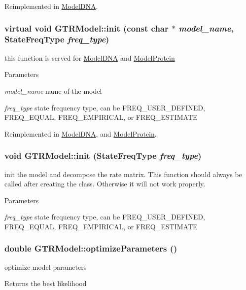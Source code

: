 Reimplemented in \hyperlink{classModelDNA_a4083dfee9b55936019483c5e9a4bb2f7}{ModelDNA}.\hypertarget{classGTRModel_ad0625a75ce5e8f5fca7f65657b2677b8}{
\subsubsection[{init}]{\setlength{\rightskip}{0pt plus 5cm}virtual void GTRModel::init (const char $\ast$ {\em model\_\-name}, \/  StateFreqType {\em freq\_\-type})}}
\label{classGTRModel_ad0625a75ce5e8f5fca7f65657b2677b8}
this function is served for \hyperlink{classModelDNA}{ModelDNA} and \hyperlink{classModelProtein}{ModelProtein} 
\begin{DoxyParams}{Parameters}
\item[{\em model\_\-name}]name of the model \item[{\em freq\_\-type}]state frequency type, can be FREQ\_\-USER\_\-DEFINED, FREQ\_\-EQUAL, FREQ\_\-EMPIRICAL, or FREQ\_\-ESTIMATE \end{DoxyParams}


Reimplemented in \hyperlink{classModelDNA_ad7f5b56ae6499a222c01ad81e92e27a2}{ModelDNA}, and \hyperlink{classModelProtein_a752778117ce79f5c0161397835fc6bf0}{ModelProtein}.\hypertarget{classGTRModel_a6a5736bfb839fca17dc6db2ee1cf91d5}{
\subsubsection[{init}]{\setlength{\rightskip}{0pt plus 5cm}void GTRModel::init (StateFreqType {\em freq\_\-type})}}
\label{classGTRModel_a6a5736bfb839fca17dc6db2ee1cf91d5}
init the model and decompose the rate matrix. This function should always be called after creating the class. Otherwise it will not work properly. 
\begin{DoxyParams}{Parameters}
\item[{\em freq\_\-type}]state frequency type, can be FREQ\_\-USER\_\-DEFINED, FREQ\_\-EQUAL, FREQ\_\-EMPIRICAL, or FREQ\_\-ESTIMATE \end{DoxyParams}
\hypertarget{classGTRModel_a01c47ec7ac4b856e60aa3e4339e0044a}{
\subsubsection[{optimizeParameters}]{\setlength{\rightskip}{0pt plus 5cm}double GTRModel::optimizeParameters ()}}
\label{classGTRModel_a01c47ec7ac4b856e60aa3e4339e0044a}
optimize model parameters \begin{DoxyReturn}{Returns}
the best likelihood 
\end{DoxyReturn}


